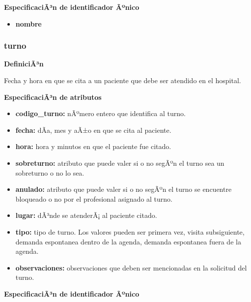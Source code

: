 \documentclass[a4paper,11pt]{article}
\begin{document}
\textbf{EspecificaciÃ³n de identificador Ãºnico}

\begin{itemize}

     \item \textbf{nombre}

\end{itemize}

\subsubsection{\textbf{turno}}

\textbf{DefiniciÃ³n}

Fecha y hora en que se cita a un paciente que debe ser atendido en el hospital.

\textbf{EspecificaciÃ³n de atributos}

\begin{itemize}

     \item \textbf{codigo\_turno:} nÃºmero entero que identifica al turno.

     \item \textbf{fecha:} dÃ­a, mes y aÃ±o en que se cita al paciente.

     \item \textbf{hora:} hora y minutos en que el paciente fue citado.

     \item \textbf{sobreturno:} atributo que puede valer si o no segÃºn el turno sea un sobreturno 
     o no lo sea.

     \item \textbf{anulado:} atributo que puede valer si o no segÃºn el turno se encuentre bloqueado 
     o no por el profesional asignado al turno.

     \item \textbf{lugar:} dÃ³nde se atenderÃ¡ al paciente citado.

     \item \textbf{tipo:} tipo de turno. Los valores pueden ser primera vez, visita subsiguiente, 
     demanda espontanea dentro de la agenda, demanda espontanea fuera de la agenda.

     \item \textbf{observaciones:} observaciones que deben ser mencionadas en la solicitud del turno.

\end{itemize}

\textbf{EspecificaciÃ³n de identificador Ãºnico}
\end{document}

